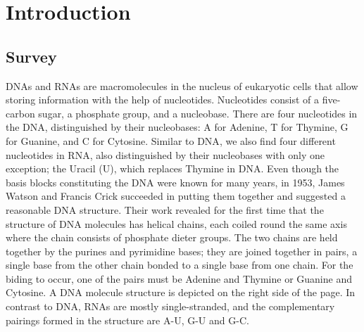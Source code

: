 \chapter{Introduction}\label{ch:introduction}
\section{Survey}
\label{sec:survey}
\acp{DNA}  and \acp{RNA} are macromolecules in the nucleus of eukaryotic cells that allow storing information with the help of nucleotides. Nucleotides consist of a five-carbon sugar, a phosphate group, and a nucleobase. There are four nucleotides in the \ac{DNA}, distinguished by their nucleobases: A for Adenine, T for Thymine, G for Guanine, and C for Cytosine. Similar to \ac{DNA}, we also find four different nucleotides in \ac{RNA}, also distinguished by their nucleobases with only one exception; the Uracil (U), which replaces Thymine in \ac{DNA}. Even though the basis blocks constituting the \ac{DNA} were known for many years, in 1953, James Watson and Francis Crick \cite{watson1953molecular} succeeded in putting them together and suggested a reasonable \ac{DNA} structure. Their work revealed for the first time that the structure of \ac{DNA} molecules has helical chains, each coiled round the same axis where the chain consists of phosphate dieter groups. The two chains are held together by the purines and pyrimidine bases; they are joined together in pairs, a single base from the other chain bonded to a single base from one chain. For the biding to occur, one of the pairs must be Adenine and Thymine or Guanine and Cytosine. A \ac{DNA} molecule structure is depicted on the right side of the page. In contrast to \ac{DNA}, \acp{RNA} are mostly single-stranded, and the complementary pairings formed in the structure are A-U, G-U and G-C.  
